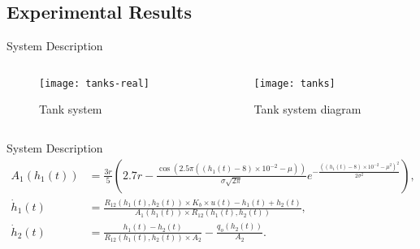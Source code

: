 \subsection{Experimental Results}%
\label{subsec:experimental-results}

\begin{slide}{System Description}
  \begin{columns}[c]
    \begin{column}{0.3\textwidth}
      \begin{figure}[ht!]
        \centering \captionsetup{justification=centering}
        \texttt{[image: tanks-real]}
        \caption{Tank system}%
        \label{fig:tanks-real}
      \end{figure}
    \end{column}%
    \hfill%
    \begin{column}{0.7\textwidth}
      \begin{figure}[ht!]
        \centering \captionsetup{justification=centering}
        \texttt{[image: tanks]}
        \caption{Tank system diagram}%
        \label{fig:tanks}
      \end{figure}
    \end{column}%
  \end{columns}
\end{slide}

\begin{slide}{System Description}
  \begin{equation}
    \begin{aligned}
      A_{1}(h_{1}(t)) & = \frac{3r}{5} \left(2.7r - \frac{\cos(2.5\pi{}((h_{1}(t)-8)\times{}10^{-2}-\mu))}{\sigma{}\sqrt{2\pi}} e^{-\frac{((h_{1}(t)-8)\times{}10^{-2}-\mu^{2})^{2}}{2\sigma^{2}}} \right), \\
      \dot{h}_1(t)    & = \frac{R_{12}(h_{1}(t),h_{2}(t))\times{}K_{b}\times{}u(t)-h_{1}(t)+h_{2}(t)}
      {A_{1}(h_{1}(t))\times{}R_{12}(h_{1}(t),h_{2}(t))},                                                                                                                                                   \\
      \dot{h}_2(t)    & = \frac{h_{1}(t)-h_{2}(t)}{R_{12}(h_{1}(t),h_{2}(t))\times{}A_{2}} - \frac{q_{o}(h_{2}(t))}{A_{2}}.
    \end{aligned}
  \end{equation}
\end{slide}

